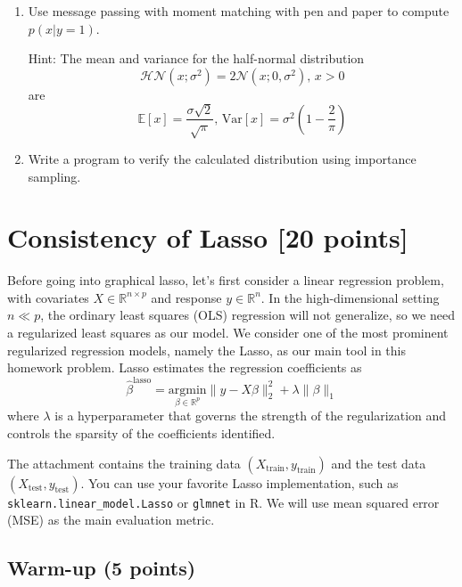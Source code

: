 \documentclass{article}
\begin{document}
\begin{enumerate}
\begin{enumerate}
\item Use message passing with moment matching with pen and paper to compute $p(x|y = 1)$.

Hint: The mean and variance for the half-normal distribution
$$\mathcal{HN}(x; \sigma^2) = 2\mathcal{N}(x; 0, \sigma^2) \text{, } x > 0$$
are
$$\mathbb{E}[x] = \frac{\sigma\sqrt{2}}{\sqrt{\pi}} \text{, } \mathrm{Var}[x] = \sigma^2\left(1 - \frac{2}{\pi}\right)$$

\item Write a program to verify the calculated distribution using importance sampling.
\end{enumerate}
\end{enumerate}

\section{Consistency of Lasso [20 points]}

Before going into graphical lasso, let's first consider a linear regression problem, with covariates $X \in \mathbb{R}^{n\times p}$
and response $y \in \mathbb{R}^n$. In the high-dimensional setting $n \ll p$, the ordinary least squares (OLS) regression will
not generalize, so we need a regularized least squares as our model. We consider one of the most prominent
regularized regression models, namely the Lasso, as our main tool in this homework problem. Lasso estimates
the regression coefficients as
\[\hat{\beta}^{\text{lasso}} = \underset{\beta\in\mathbb{R}^p}{\text{argmin}} \|y - X\beta\|_2^2 + \lambda\|\beta\|_1 \tag{1}\]
where $\lambda$ is a hyperparameter that governs the strength of the regularization and controls the sparsity of the
coefficients identified.

The attachment contains the training data $(X_{\text{train}}, y_{\text{train}})$ and the test data $(X_{\text{test}}, y_{\text{test}})$. You can use
your favorite Lasso implementation, such as \texttt{sklearn.linear\_model.Lasso} or \texttt{glmnet} in R. We will use
mean squared error (MSE) as the main evaluation metric.

\subsection{Warm-up (5 points)}
\end{document}
